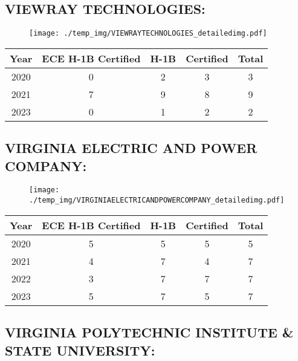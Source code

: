 \documentclass{article}%
\begin{document}
%
\newpage%
\subsection{VIEWRAY TECHNOLOGIES:}%
\label{subsec:VIEWRAYTECHNOLOGIES}%
\label{VIEWRAYTECHNOLOGIESdetailed}%


\begin{figure}[htbp]%
\centering%
\texttt{[image: ./temp\_img/VIEWRAYTECHNOLOGIES\_detailedimg.pdf]}%
\end{figure}

%
\begin{longtable}{c|c|c|c|c}%
\hline%
Year&ECE H{-}1B Certified&H{-}1B&Certified&Total\\%
\hline%
2020&0&2&3&3\\%
\hline%
2021&7&9&8&9\\%
\hline%
2023&0&1&2&2\\%
\hline%
\end{longtable}

%
\newpage%
\subsection{VIRGINIA ELECTRIC AND POWER COMPANY:}%
\label{subsec:VIRGINIAELECTRICANDPOWERCOMPANY}%
\label{VIRGINIAELECTRICANDPOWERCOMPANYdetailed}%


\begin{figure}[htbp]%
\centering%
\texttt{[image: ./temp\_img/VIRGINIAELECTRICANDPOWERCOMPANY\_detailedimg.pdf]}%
\end{figure}

%
\begin{longtable}{c|c|c|c|c}%
\hline%
Year&ECE H{-}1B Certified&H{-}1B&Certified&Total\\%
\hline%
2020&5&5&5&5\\%
\hline%
2021&4&7&4&7\\%
\hline%
2022&3&7&7&7\\%
\hline%
2023&5&7&5&7\\%
\hline%
\end{longtable}

%
\newpage%
\subsection{VIRGINIA POLYTECHNIC INSTITUTE \& STATE UNIVERSITY:}%
\label{subsec:VIRGINIAPOLYTECHNICINSTITUTESTATEUNIVERSITY}%
\label{VIRGINIAPOLYTECHNICINSTITUTESTATEUNIVERSITYdetailed}%
\end{document}

